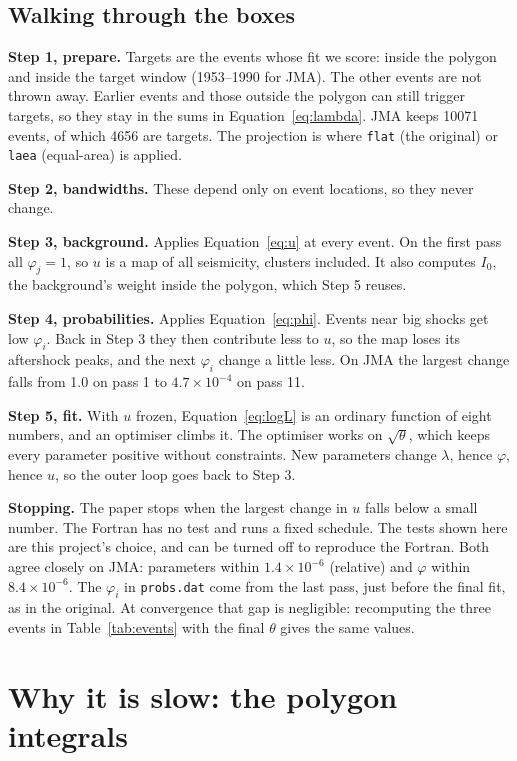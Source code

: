 \documentclass[11pt,a4paper]{article}
\newcommand{\code}[1]{\texttt{#1}}
\begin{document}
\subsection*{Walking through the boxes}

\textbf{Step 1, prepare.} Targets are the events whose fit we score: inside the polygon and inside
the target window (1953--1990 for JMA). The other events are not thrown away. Earlier events and
those outside the polygon can still trigger targets, so they stay in the sums in
Equation~\eqref{eq:lambda}. JMA keeps 10071 events, of which 4656 are targets. The projection is
where \code{flat} (the original) or \code{laea} (equal-area) is applied.

\textbf{Step 2, bandwidths.} These depend only on event locations, so they never change.

\textbf{Step 3, background.} Applies Equation~\eqref{eq:u} at every event. On the first pass all
$\varphi_j=1$, so $u$ is a map of all seismicity, clusters included. It also computes
$I_0$, the background's weight inside the polygon, which Step 5 reuses.

\textbf{Step 4, probabilities.} Applies Equation~\eqref{eq:phi}. Events near big shocks get low
$\varphi_i$. Back in Step 3 they then contribute less to $u$, so the map loses its
aftershock peaks, and the next $\varphi_i$ change a little less. On JMA the largest change
falls from 1.0 on pass 1 to $4.7\times10^{-4}$ on pass 11.

\textbf{Step 5, fit.} With $u$ frozen, Equation~\eqref{eq:logL} is an ordinary function of eight
numbers, and an optimiser climbs it. The optimiser works on $\sqrt\theta$, which keeps every
parameter positive without constraints. New parameters change $\lambda$, hence $\varphi$, hence
$u$, so the outer loop goes back to Step 3.

\textbf{Stopping.} The paper stops when the largest change in $u$ falls below a small number. The
Fortran has no test and runs a fixed schedule. The tests shown here are this project's choice, and
can be turned off to reproduce the Fortran. Both agree closely on JMA: parameters within $1.4\times10^{-6}$ (relative)
and $\varphi$ within $8.4\times10^{-6}$. The $\varphi_i$ in \code{probs.dat} come from the last
pass, just before the final fit, as in the original. At convergence that gap is negligible:
recomputing the three events in Table~\ref{tab:events} with the final $\theta$ gives the same values.

\section{Why it is slow: the polygon integrals}
\end{document}
